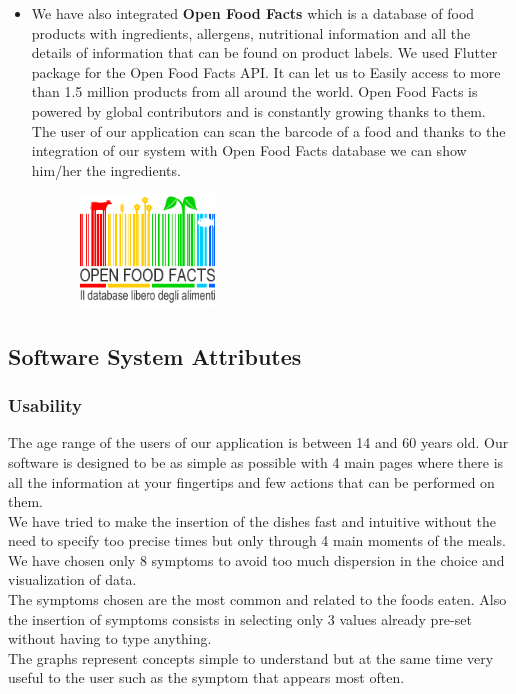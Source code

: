 \documentclass [12pt]{article}
\begin{document}
\begin{itemize}
To handle the authentication of external services (google, github and twitter) we also imported the firebase plugin: lit\textunderscore firebase\textunderscore auth: 0.3.0 
\\

\item We have also integrated  \textbf{Open Food Facts} which is a database of food products with ingredients, allergens, nutritional information and all the details of information that can be found on product labels.
We used Flutter package for the Open Food Facts API. It can let us to Easily access to more than 1.5 million products from all around the world. Open Food Facts is powered by global contributors and is constantly growing thanks to them.
The user of our application can scan the barcode of a food and thanks to the integration of our system with Open Food Facts database we can show him/her the ingredients.
\begin{figure}[ht!]
\centering
\includegraphics[height=3cm, width=4cm]{openfoodfacts.png}
\end{figure}

\end{itemize}

\clearpage
\subsection{Software System Attributes} 

\subsubsection{Usability}
The age range of the users of our application is between 14 and 60 years old.
Our software is designed to be as simple as possible with 4 main pages where there is all the information at your fingertips and few actions that can be performed on them.\\
We have tried to make the insertion of the dishes fast and intuitive without the need to specify too precise times but only through 4 main moments of the meals.
We have chosen only 8 symptoms to avoid too much dispersion in the choice and visualization of data.\\
The symptoms chosen are the most common and related to the foods eaten.
Also the insertion of symptoms consists in selecting only 3 values already pre-set without having to type anything.\\
The graphs represent concepts simple to understand but at the same time very useful to the user such as the symptom that appears most often.
\end{document}
